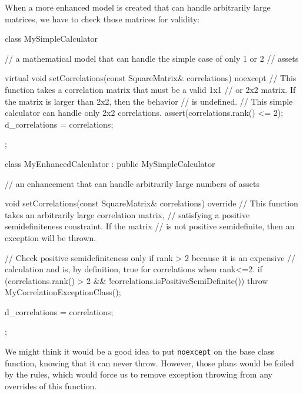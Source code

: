 When a more enhanced model is created that can handle arbitrarily large
matrices, we have to check those matrices for validity:

\begin{emcppslisting}
class MySimpleCalculator
{
    // a mathematical model that can handle the simple case of only 1 or 2
    // assets

    virtual void setCorrelations(const SquareMatrix& correlations) noexcept
        // This function takes a correlation matrix that must be a valid 1x1
        // or 2x2 matrix.  If the matrix is larger than 2x2, then the behavior
        // is undefined.
    {
        // This simple calculator can handle only 2x2 correlations.
        assert(correlations.rank() <= 2);
        d_correlations = correlations;
    }
};

class MyEnhancedCalculator : public MySimpleCalculator
{
    // an enhancement that can handle arbitrarily large numbers of assets

    void setCorrelations(const SquareMatrix& correlations) override
        // This function takes an arbitrarily large correlation matrix,
        // satisfying a positive semidefiniteness constraint.  If the matrix
        // is not positive semidefinite, then an exception will be thrown.
    {
        // Check positive semidefiniteness only if rank > 2 because it is an expensive
        // calculation and is, by definition, true for correlations when rank<=2.
        if (correlations.rank() > 2 && !correlations.isPositiveSemiDefinite())
        {
            throw MyCorrelationExceptionClass();
        }

        d_correlations = correlations;
    }
};

\end{emcppslisting}
    

\noindent We might think it would be a good idea to put \lstinline!noexcept! on the
base class function, knowing that it can never throw. However, those
plans would be foiled by the rules, which would force us to remove
exception throwing from any overrides of this function.

